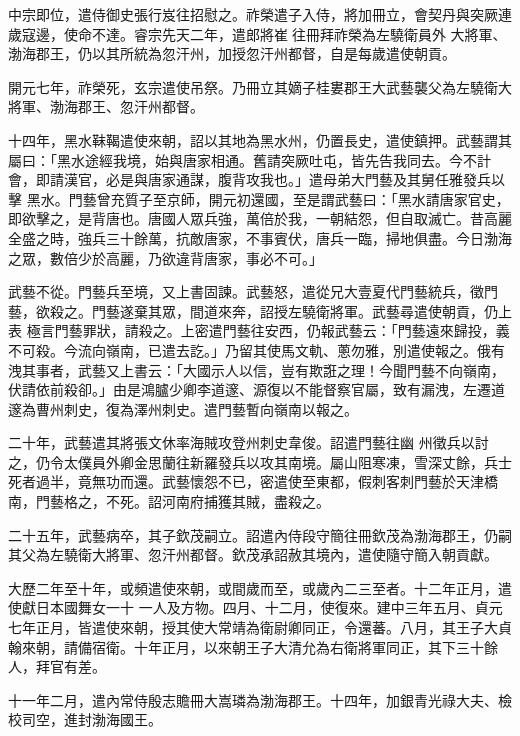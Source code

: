 \begin{pinyinscope}
 中宗即位，遣侍御史張行岌往招慰之。祚榮遣子入侍，將加冊立，會契丹與突厥連歲寇邊，使命不達。睿宗先天二年，遣郎將崔往冊拜祚榮為左驍衛員外
 大將軍、渤海郡王，仍以其所統為忽汗州，加授忽汗州都督，自是每歲遣使朝貢。



 開元七年，祚榮死，玄宗遣使吊祭。乃冊立其嫡子桂婁郡王大武藝襲父為左驍衛大將軍、渤海郡王、忽汗州都督。



 十四年，黑水靺鞨遣使來朝，詔以其地為黑水州，仍置長史，遣使鎮押。武藝謂其屬曰：「黑水途經我境，始與唐家相通。舊請突厥吐屯，皆先告我同去。今不計會，即請漢官，必是與唐家通謀，腹背攻我也。」遣母弟大門藝及其舅任雅發兵以擊
 黑水。門藝曾充質子至京師，開元初還國，至是謂武藝曰：「黑水請唐家官史，即欲擊之，是背唐也。唐國人眾兵強，萬倍於我，一朝結怨，但自取滅亡。昔高麗全盛之時，強兵三十餘萬，抗敵唐家，不事賓伏，唐兵一臨，掃地俱盡。今日渤海之眾，數倍少於高麗，乃欲違背唐家，事必不可。」



 武藝不從。門藝兵至境，又上書固諫。武藝怒，遣從兄大壹夏代門藝統兵，徵門藝，欲殺之。門藝遂棄其眾，間道來奔，詔授左驍衛將軍。武藝尋遣使朝貢，仍上表
 極言門藝罪狀，請殺之。上密遣門藝往安西，仍報武藝云：「門藝遠來歸投，義不可殺。今流向嶺南，已遣去訖。」乃留其使馬文軌、蔥勿雅，別遣使報之。俄有洩其事者，武藝又上書云：「大國示人以信，豈有欺誑之理！今聞門藝不向嶺南，伏請依前殺卻。」由是鴻臚少卿李道邃、源復以不能督察官屬，致有漏洩，左遷道邃為曹州刺史，復為澤州刺史。遣門藝暫向嶺南以報之。



 二十年，武藝遣其將張文休率海賊攻登州刺史韋俊。詔遣門藝往幽
 州徵兵以討之，仍令太僕員外卿金思蘭往新羅發兵以攻其南境。屬山阻寒凍，雪深丈餘，兵士死者過半，竟無功而還。武藝懷怨不已，密遣使至東都，假刺客刺門藝於天津橋南，門藝格之，不死。詔河南府捕獲其賊，盡殺之。



 二十五年，武藝病卒，其子欽茂嗣立。詔遣內侍段守簡往冊欽茂為渤海郡王，仍嗣其父為左驍衛大將軍、忽汗州都督。欽茂承詔赦其境內，遣使隨守簡入朝貢獻。



 大歷二年至十年，或頻遣使來朝，或間歲而至，或歲內二三至者。十二年正月，遣使獻日本國舞女一十
 一人及方物。四月、十二月，使復來。建中三年五月、貞元七年正月，皆遣使來朝，授其使大常靖為衛尉卿同正，令還蕃。八月，其王子大貞翰來朝，請備宿衛。十年正月，以來朝王子大清允為右衛將軍同正，其下三十餘人，拜官有差。



 十一年二月，遣內常侍殷志贍冊大嵩璘為渤海郡王。十四年，加銀青光祿大夫、檢校司空，進封渤海國王。




\end{pinyinscope}
